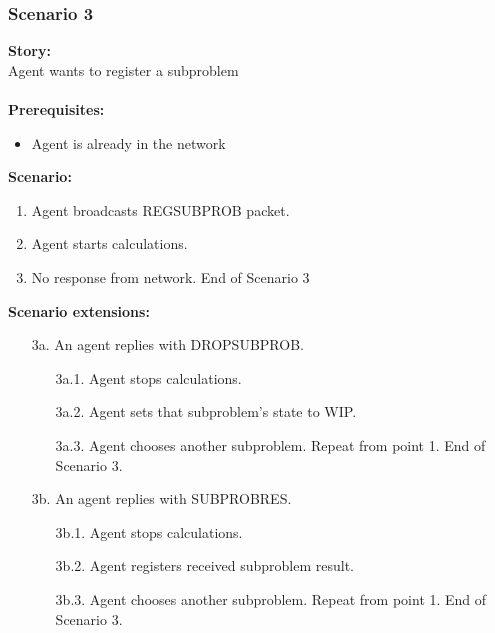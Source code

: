 \documentclass{article}
\begin{document}
\subsubsection{Scenario 3}
\noindent\textbf{Story:} \\
Agent wants to register a subproblem \\\\
\textbf{Prerequisites:}
\begin{itemize}
    \item Agent is already in the network
\end{itemize}
\textbf{Scenario:}
\begin{enumerate}
    \item Agent broadcasts REGSUBPROB packet.
    \item Agent starts calculations.
    \item No response from network. End of Scenario 3
\end{enumerate}
\textbf{Scenario extensions:}
\begin{itemize}
    \item[3a.] An agent replies with DROPSUBPROB.
    \begin{itemize} 
    \item[3a.1.] Agent stops calculations.
    \item[3a.2.] Agent sets that subproblem's state to WIP.
    \item[3a.3.] Agent chooses another subproblem. Repeat from point 1. End of Scenario 3.  
    \end{itemize}
    \item[3b.] An agent replies with SUBPROBRES. 
    \begin{itemize} 
    \item[3b.1.] Agent stops calculations.
    \item[3b.2.] Agent registers received subproblem result. 
    \item[3b.3.] Agent chooses another subproblem. Repeat from point 1. End of Scenario 3.  
    \end{itemize}
\end{itemize}
\end{document}

